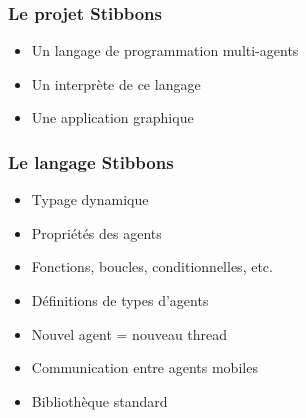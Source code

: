 \begin{frame}
\frametitle{Le projet Stibbons}
\begin{itemize}
	\item Un langage de programmation multi-agents
	\item Un interprète de ce langage
	\item Une application graphique
\end{itemize}
\end{frame}

\begin{frame}
\frametitle{Le langage Stibbons}
\begin{itemize}
        \item Typage dynamique
        \item Propriétés des agents
        \item Fonctions, boucles, conditionnelles, etc.
        \item Définitions de types d'agents
        \item Nouvel agent = nouveau thread
        \item Communication entre agents mobiles
        \item Bibliothèque standard
\end{itemize}
\end{frame}

